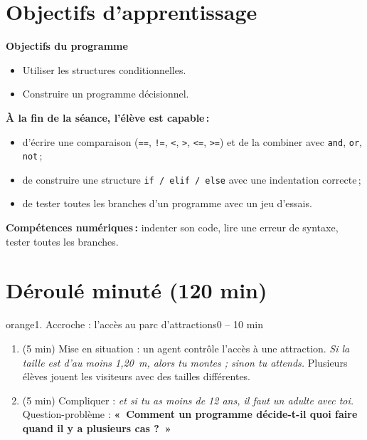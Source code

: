 \documentclass[11pt,a4paper]{article}
\begin{document}
\section{Objectifs d'apprentissage}
\begin{tcolorbox}[colback=gray!8,colframe=gray!60!black,arc=1mm,boxrule=0.5pt]
\textbf{Objectifs du programme}
\begin{itemize}
 \item Utiliser les structures conditionnelles.
 \item Construire un programme décisionnel.
\end{itemize}
\textbf{À la fin de la séance, l'élève est capable\,:}
\begin{itemize}
 \item d'écrire une comparaison (\texttt{==}, \texttt{!=}, \texttt{<}, \texttt{>}, \texttt{<=}, \texttt{>=}) et de la combiner avec \texttt{and}, \texttt{or}, \texttt{not}\,;
 \item de construire une structure \texttt{if / elif / else} avec une indentation correcte\,;
 \item de tester toutes les branches d'un programme avec un jeu d'essais.
\end{itemize}
\textbf{Compétences numériques\,:} indenter son code, lire une erreur de syntaxe, tester toutes les branches.
\end{tcolorbox}

\section{Déroulé minuté (120 min)}

\begin{etape}{orange}{1. Accroche : l'accès au parc d'attractions}{0 -- 10 min}
\begin{enumerate}
 \item (5 min) Mise en situation : un agent contrôle l'accès à une attraction. \emph{Si la taille est d'au moins 1,20~m, alors tu montes ; sinon tu attends.} Plusieurs élèves jouent les visiteurs avec des tailles différentes.
 \item (5 min) Compliquer : \emph{et si tu as moins de 12 ans, il faut un adulte avec toi.} Question-problème : \textbf{«~Comment un programme décide-t-il quoi faire quand il y a plusieurs cas ?~»}
\end{enumerate}
\end{etape}
\end{document}
